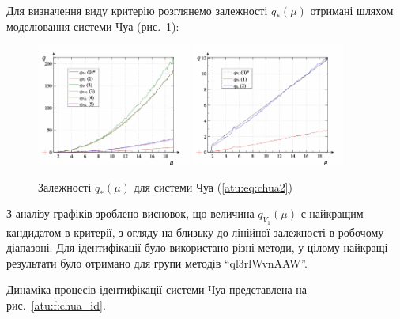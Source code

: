 \documentclass[a4paper,13pt]{atuaref}
\DeclareMathOperator*{\sign}{sign}
\begin{document}
Для визначення виду критерію розглянемо залежності $ q_{*}(\mu)$ отримані
шляхом моделювання системи Чуа (рис.~\ref{atu:f:chua_q}):

\begin{figure}[htb!]
\centerline{
  \includegraphics[width=0.45\textwidth]{p5/p/cha/chua/chua_q-p_mu2.png}
  \includegraphics[width=0.45\textwidth]{p5/p/cha/chua/chua_q-p_mu1.png}
}
  \caption{Залежності $q_{*}(\mu)$ для системи Чуа (\ref{atu:eq:chua2})}
\label{atu:f:chua_q}
\end{figure}

З аналізу графіків зроблено висновок, що величина $q_{V_1}(\mu)$
є найкращим кандидатом в критерії, з огляду на близьку до лінійної залежності в робочому діапазоні.
%
Для ідентифікації було використано різні методи, у цілому найкращі результати було
отримано для групи методів ``ql3rlWvnAAW''.

Динаміка процесів ідентифікації системи Чуа представлена на рис.~\ref{atu:f:chua_id}.
\end{document}
